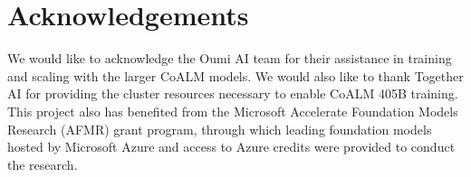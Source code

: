 \section{Acknowledgements}
We would like to acknowledge the Oumi AI team \cite{oumi2025} for their assistance in training and scaling with the larger CoALM models. We would also like to thank Together AI \cite{togetherai} for providing the cluster resources necessary to enable CoALM 405B training. This project also has benefited from the Microsoft Accelerate Foundation
Models Research (AFMR) grant program, through which leading foundation models hosted by Microsoft Azure and access to Azure credits were provided to conduct the research.